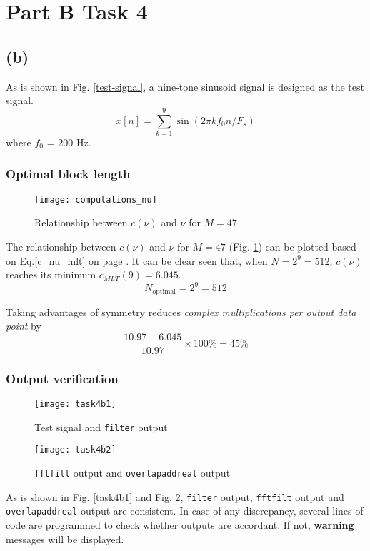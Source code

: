 \documentclass{article}
\newenvironment{homeworkProblem}[1]{
	\section*{#1}
	}{
}
\newenvironment{homeworkSection}[1]{
	\subsection*{#1}
	}{
}
\begin{document}
\begin{homeworkProblem}{Part B Task 4}
\begin{homeworkSection}{(b)}
As is shown in Fig. \ref{test-signal}, a nine-tone sinusoid signal is designed as the test signal.
\begin{equation}
x[n] = \sum_{k=1}^{9} \sin(2\pi k f_0 n / F_s)
\end{equation}
where $f_0$ = 200 Hz.

\subsubsection*{Optimal block length}
\begin{figure}[H]
\centering
\texttt{[image: computations\_nu]}
\caption{Relationship between $c(\nu)$ and $\nu$ for $M = 47$}
\label{computations_nu}
\end{figure}

The relationship between $c(\nu)$ and $\nu$ for $M = 47$ (Fig. \ref{computations_nu}) can be plotted based on Eq.\ref{c_nu_mlt} on page \pageref{c_nu_mlt}. It can be clear seen that, when $N = 2^9 = 512$, $c(\nu)$ reaches its minimum \textbf{$c_{MLT}(9) = 6.045$}.
\begin{equation}
N_\text{optimal} = 2^9 = 512
\end{equation}

Taking advantages of symmetry reduces \textit{complex multiplications per output data point} by
\begin{equation}
\frac{10.97 - 6.045}{10.97} \times 100\% = 45\%
\end{equation}

\subsubsection*{Output verification}
\begin{figure}[H]
\begin{minipage}[t]{0.5\linewidth}
\centering
\texttt{[image: task4b1]}
\caption{Test signal and \texttt{filter} output}
\label{task4b1}
\end{minipage}
\begin{minipage}[t]{0.5\linewidth}
\centering
\texttt{[image: task4b2]}
\caption{\texttt{fftfilt} output and \texttt{overlapaddreal} output}
\label{task4b2}
\end{minipage}
\end{figure}

As is shown in Fig. \ref{task4b1} and Fig. \ref{task4b2}, \texttt{filter} output, \texttt{fftfilt} output and \texttt{overlapaddreal} output are consistent. In case of any discrepancy, several lines of code are programmed to check whether outputs are accordant. If not, \textbf{warning} messages will be displayed.\\


\end{homeworkSection}
\end{homeworkProblem}
\end{document}
